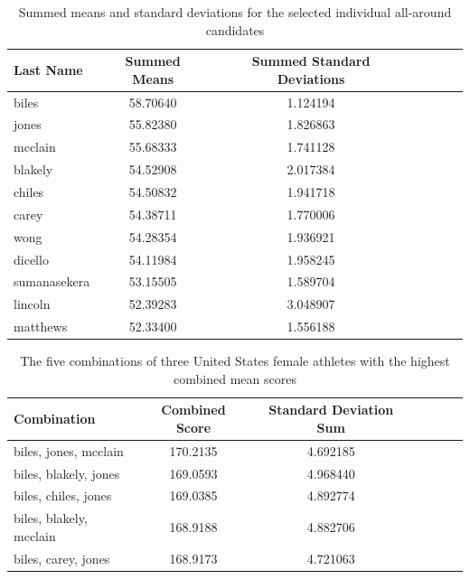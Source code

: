 \documentclass[12pt]{article}
\begin{document}
\begin{table}[tbp]
  \caption{Summed means and standard deviations for the selected individual all-around candidates}
  \label{tab:tableBBP}
\centering
\begin{tabular}[t]{lccllll}
 \toprule
Last Name & Summed Means & Summed Standard Deviations\\
\midrule
biles & 58.70640 & 1.124194\\
\midrule
jones & 55.82380 & 1.826863\\
\midrule
mcclain & 55.68333 & 1.741128\\
\midrule
blakely & 54.52908 & 2.017384\\
\midrule
chiles & 54.50832 & 1.941718\\
\midrule
carey & 54.38711 & 1.770006\\
\midrule
wong & 54.28354 & 1.936921\\
\midrule
dicello & 54.11984 & 1.958245\\
\midrule
sumanasekera & 53.15505 & 1.589704\\
\midrule
lincoln & 52.39283 & 3.048907\\
\midrule
matthews & 52.33400 & 1.556188\\
\bottomrule
\end{tabular}
\end{table}

\begin{table}[tbp]
  \caption{The five combinations of three United States female athletes with the highest combined mean scores}
  \label{tab:tableAA3}
\centering
\begin{tabular}[t]{lccllll}
 \toprule
Combination & Combined Score & Standard Deviation Sum\\
\midrule
biles, jones, mcclain & 170.2135 & 4.692185\\
\midrule
biles, blakely, jones & 169.0593 & 4.968440\\
\midrule
biles, chiles, jones & 169.0385 & 4.892774\\
\midrule
biles, blakely, mcclain & 168.9188 & 4.882706\\
\midrule
biles, carey, jones
& 168.9173 & 4.721063
\\
\bottomrule
\end{tabular}
\end{table} 
\end{document}
